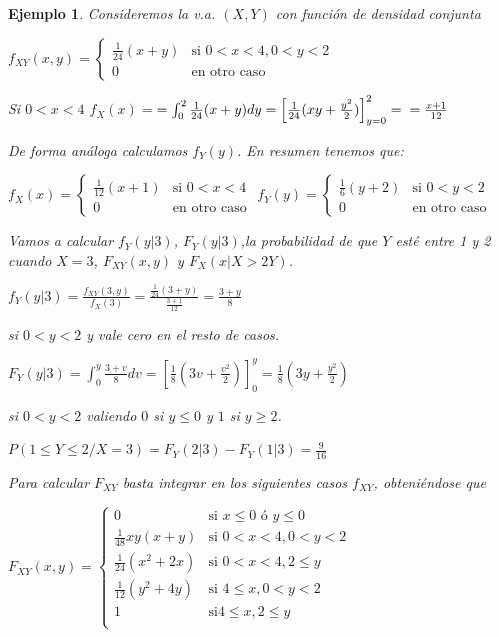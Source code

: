 \documentclass[12pt]{report}
\newtheorem{example}[definition]{Ejemplo}
\begin{document}
\begin{example}  Consideremos la v.a. $(X,Y)$ con función de densidad conjunta


$f_{XY}(x,y)=\left\{\begin{array}{ll} \frac{1}{24} (x+y)&\mbox{si } 0<x<4, 0<y<2 \\ 0 &
\mbox{en otro caso}\end{array}\right.$

Si $0<x<4$ $f_{X}(x)=$\newline $=\int_{0}^2\frac{1}{24} (x+y) dy=\left[\frac{1}{24}(xy
+\frac{y^2}{2})\right]_{y=0}^2=\newline =\frac{x+1}{12}$

De forma análoga calculamos $f_{Y}(y)$. En resumen tenemos que:


$f_{X}(x)=\left\{\begin{array}{ll} \frac{1}{12} (x+1)&\mbox{si } 0<x<4 \\ 0 & \mbox{en otro
caso}\end{array}\right.$
\newline
$f_{Y}(y)=\left\{\begin{array}{ll} \frac{1}{6} (y+2) & \mbox{si }  0<y<2 \\ 0 & \mbox{en
otro caso}\end{array}\right.$

Vamos a calcular $f_{Y}(y|3)$, $F_{Y}(y|3)$,la pro\-ba\-bi\-li\-dad de que $Y$ esté entre 1
y 2 cuando $X=3$, $F_{XY}(x,y)$ y $F_{X}(x|X>2Y)$.


$f_{Y}(y|3)=\frac{f_{XY}(3,y)}{f_{X}(3)}=
\frac{\frac{1}{24}(3+y)}{\frac{3+1}{12}}=\frac{3+y}{8}$

si $0<y<2$ y vale cero en el resto de casos.

$F_{Y}(y|3)=\int_{0}^y \frac{3+v}{8}dv= \left[
\frac{1}{8}(3v+\frac{v^2}{2})\right]_{0}^y=\frac{1}{8}(3y+\frac{y^2}{2})$

si $0<y<2$ valiendo $0$ si $y\leq 0$ y $1$ si $y\geq 2$.

$P(1\leq Y\leq 2/X=3)=F_{Y}(2|3)-F_{Y}(1|3)= \frac{9}{16}$


Para calcular $F_{XY}$ basta integrar en los si\-gui\-en\-tes casos $f_{XY}$, obteniéndose
que

$F_{XY}(x,y)=\left\{\begin{array}{ll} 0 & \mbox{si } x\leq 0\mbox{ ó } y\leq 0\\
\frac{1}{48} xy(x+y) & \mbox{si } \scriptstyle{0< x<4,0<y<2}\\ \frac{1}{24} (x^2+2x) &
\mbox{si } 0< x<4,2\leq y\\ \frac{1}{12} (y^2+4y) & \mbox{si } 4\leq x,0<y<2\\ 1 & \mbox{si
} 4\leq x,2\leq y\\
\end{array}\right.$


\end{example}
\end{document}
